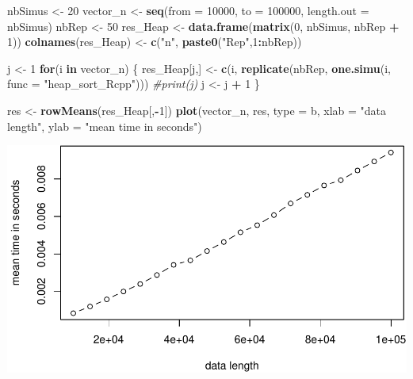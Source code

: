 \documentclass[
]{article}
\newenvironment{Shaded}{\begin{snugshade}}{\end{snugshade}}
\newcommand{\AttributeTok}[1]{\textcolor[rgb]{0.13,0.29,0.53}{#1}}
\newcommand{\CommentTok}[1]{\textcolor[rgb]{0.56,0.35,0.01}{\textit{#1}}}
\newcommand{\ControlFlowTok}[1]{\textcolor[rgb]{0.13,0.29,0.53}{\textbf{#1}}}
\newcommand{\DecValTok}[1]{\textcolor[rgb]{0.00,0.00,0.81}{#1}}
\newcommand{\FunctionTok}[1]{\textcolor[rgb]{0.13,0.29,0.53}{\textbf{#1}}}
\newcommand{\NormalTok}[1]{#1}
\newcommand{\OtherTok}[1]{\textcolor[rgb]{0.56,0.35,0.01}{#1}}
\newcommand{\SpecialCharTok}[1]{\textcolor[rgb]{0.81,0.36,0.00}{\textbf{#1}}}
\newcommand{\StringTok}[1]{\textcolor[rgb]{0.31,0.60,0.02}{#1}}
\begin{document}
\begin{Shaded}
\begin{Highlighting}[]
\NormalTok{nbSimus }\OtherTok{\textless{}{-}} \DecValTok{20}
\NormalTok{vector\_n }\OtherTok{\textless{}{-}} \FunctionTok{seq}\NormalTok{(}\AttributeTok{from =} \DecValTok{10000}\NormalTok{, }\AttributeTok{to =} \DecValTok{100000}\NormalTok{, }\AttributeTok{length.out =}\NormalTok{ nbSimus)}
\NormalTok{nbRep }\OtherTok{\textless{}{-}} \DecValTok{50}
\NormalTok{res\_Heap }\OtherTok{\textless{}{-}} \FunctionTok{data.frame}\NormalTok{(}\FunctionTok{matrix}\NormalTok{(}\DecValTok{0}\NormalTok{, nbSimus, nbRep }\SpecialCharTok{+} \DecValTok{1}\NormalTok{))}
\FunctionTok{colnames}\NormalTok{(res\_Heap) }\OtherTok{\textless{}{-}} \FunctionTok{c}\NormalTok{(}\StringTok{"n"}\NormalTok{, }\FunctionTok{paste0}\NormalTok{(}\StringTok{"Rep"}\NormalTok{,}\DecValTok{1}\SpecialCharTok{:}\NormalTok{nbRep))}

\NormalTok{j }\OtherTok{\textless{}{-}} \DecValTok{1}
\ControlFlowTok{for}\NormalTok{(i }\ControlFlowTok{in}\NormalTok{ vector\_n)}
\NormalTok{\{}
\NormalTok{  res\_Heap[j,] }\OtherTok{\textless{}{-}} \FunctionTok{c}\NormalTok{(i, }\FunctionTok{replicate}\NormalTok{(nbRep, }\FunctionTok{one.simu}\NormalTok{(i, }\AttributeTok{func =} \StringTok{"heap\_sort\_Rcpp"}\NormalTok{)))  }
  \CommentTok{\#print(j)}
\NormalTok{  j }\OtherTok{\textless{}{-}}\NormalTok{ j }\SpecialCharTok{+} \DecValTok{1}
\NormalTok{\}}

\NormalTok{res }\OtherTok{\textless{}{-}} \FunctionTok{rowMeans}\NormalTok{(res\_Heap[,}\SpecialCharTok{{-}}\DecValTok{1}\NormalTok{])}
\FunctionTok{plot}\NormalTok{(vector\_n, res, }\AttributeTok{type =} \StringTok{\textquotesingle{}b\textquotesingle{}}\NormalTok{, }\AttributeTok{xlab =} \StringTok{"data length"}\NormalTok{, }\AttributeTok{ylab =} \StringTok{"mean time in seconds"}\NormalTok{)}
\end{Highlighting}
\end{Shaded}

\includegraphics{Sorting_analyse_files/figure-latex/unnamed-chunk-13-1.pdf}
\end{document}
